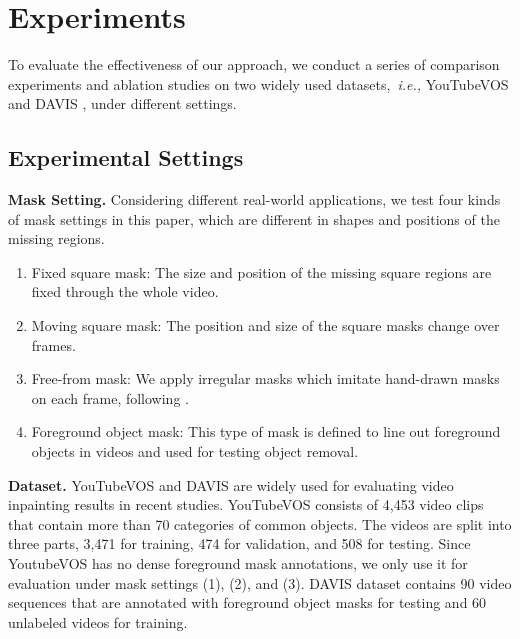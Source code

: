 
\section{Experiments}\label{sec:exp}
To evaluate the effectiveness of our approach, we conduct a series of comparison experiments and ablation studies on two widely used datasets,~\emph{i.e.,} YouTubeVOS \cite{xu2018Youtube} and DAVIS \cite{davis_2017}, under different settings.

\subsection{Experimental Settings}
\noindent \textbf{Mask Setting.} Considering different real-world applications, we test four kinds of mask settings in this paper, which are different in shapes and positions of the missing regions. 
\begin{enumerate}
\item Fixed square mask: The size and position of the missing square regions are fixed through the whole video. 
\item Moving square mask: The position and size of the square masks change over frames. 
\item Free-from mask: We apply irregular masks which imitate hand-drawn masks on each frame, following \cite{liu2018partialinpainting}. 
\item Foreground object mask: This type of mask is defined to line out foreground objects in videos and used for testing object removal.
\end{enumerate}

\noindent\textbf{Dataset.} 
YouTubeVOS and DAVIS are widely used for evaluating video inpainting results in recent studies.
YouTubeVOS consists of 4,453 video clips that contain more than 70 categories of common objects. 
The videos are split into three parts, 3,471 for training, 474 for validation, and 508 for testing. Since YoutubeVOS has no dense foreground mask annotations, we only use it for evaluation under mask settings (1), (2), and (3). 
% 
DAVIS dataset contains 90 video sequences that are annotated with foreground object masks for testing and 60 unlabeled videos for training.


